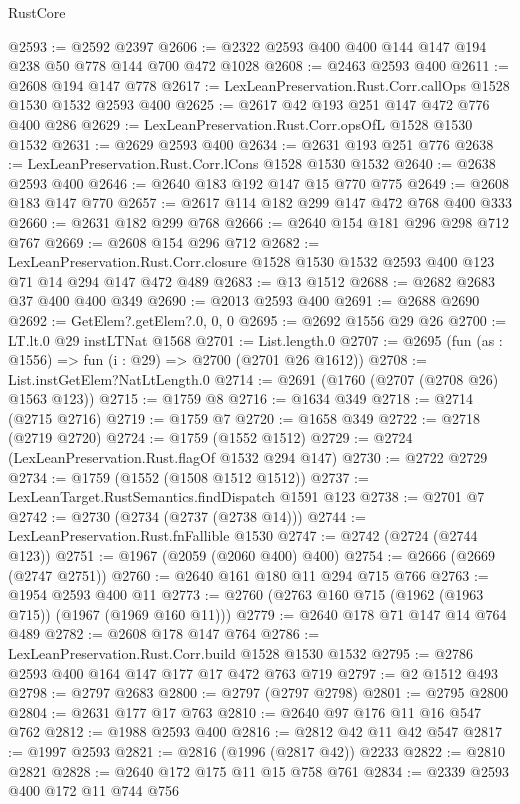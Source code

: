 \begin{lexlean}{RustCore}
\begin{coremodule}
@2593 := @2592 @2397
@2606 := @2322 @2593 @400 @400 @144 @147 @194 @238 @50 @778 @144 @700 @472 @1028
@2608 := @2463 @2593 @400
@2611 := @2608 @194 @147 @778
@2617 := LexLeanPreservation.Rust.Corr.callOps @1528 @1530 @1532 @2593 @400
@2625 := @2617 @42 @193 @251 @147 @472 @776 @400 @286
@2629 := LexLeanPreservation.Rust.Corr.opsOfL @1528 @1530 @1532
@2631 := @2629 @2593 @400
@2634 := @2631 @193 @251 @776
@2638 := LexLeanPreservation.Rust.Corr.lCons @1528 @1530 @1532
@2640 := @2638 @2593 @400
@2646 := @2640 @183 @192 @147 @15 @770 @775
@2649 := @2608 @183 @147 @770
@2657 := @2617 @114 @182 @299 @147 @472 @768 @400 @333
@2660 := @2631 @182 @299 @768
@2666 := @2640 @154 @181 @296 @298 @712 @767
@2669 := @2608 @154 @296 @712
@2682 := LexLeanPreservation.Rust.Corr.closure
    @1528
    @1530
    @1532
    @2593
    @400
    @123
    @71
    @14
    @294
    @147
    @472
    @489
@2683 := @13 @1512
@2688 := @2682 @2683 @37 @400 @400 @349
@2690 := @2013 @2593 @400
@2691 := @2688 @2690
@2692 := GetElem?.getElem?.{0, 0, 0}
@2695 := @2692 @1556 @29 @26
@2700 := LT.lt.{0} @29 instLTNat @1568
@2701 := List.length.{0}
@2707 := @2695 (fun (as : @1556) => fun (i : @29) => @2700 (@2701 @26 @1612))
@2708 := List.instGetElem?NatLtLength.{0}
@2714 := @2691 (@1760 (@2707 (@2708 @26) @1563 @123))
@2715 := @1759 @8
@2716 := @1634 @349
@2718 := @2714 (@2715 @2716)
@2719 := @1759 @7
@2720 := @1658 @349
@2722 := @2718 (@2719 @2720)
@2724 := @1759 (@1552 @1512)
@2729 := @2724 (LexLeanPreservation.Rust.flagOf @1532 @294 @147)
@2730 := @2722 @2729
@2734 := @1759 (@1552 (@1508 @1512 @1512))
@2737 := LexLeanTarget.RustSemantics.findDispatch @1591 @123
@2738 := @2701 @7
@2742 := @2730 (@2734 (@2737 (@2738 @14)))
@2744 := LexLeanPreservation.Rust.fnFallible @1530
@2747 := @2742 (@2724 (@2744 @123))
@2751 := @1967 (@2059 (@2060 @400) @400)
@2754 := @2666 (@2669 (@2747 @2751))
@2760 := @2640 @161 @180 @11 @294 @715 @766
@2763 := @1954 @2593 @400 @11
@2773 := @2760 (@2763 @160 @715 (@1962 (@1963 @715)) (@1967 (@1969 @160 @11)))
@2779 := @2640 @178 @71 @147 @14 @764 @489
@2782 := @2608 @178 @147 @764
@2786 := LexLeanPreservation.Rust.Corr.build @1528 @1530 @1532
@2795 := @2786 @2593 @400 @164 @147 @177 @17 @472 @763 @719
@2797 := @2 @1512 @493
@2798 := @2797 @2683
@2800 := @2797 (@2797 @2798)
@2801 := @2795 @2800
@2804 := @2631 @177 @17 @763
@2810 := @2640 @97 @176 @11 @16 @547 @762
@2812 := @1988 @2593 @400
@2816 := @2812 @42 @11 @42 @547
@2817 := @1997 @2593
@2821 := @2816 (@1996 (@2817 @42)) @2233
@2822 := @2810 @2821
@2828 := @2640 @172 @175 @11 @15 @758 @761
@2834 := @2339 @2593 @400 @172 @11 @744 @756

\end{coremodule}
\end{lexlean}

